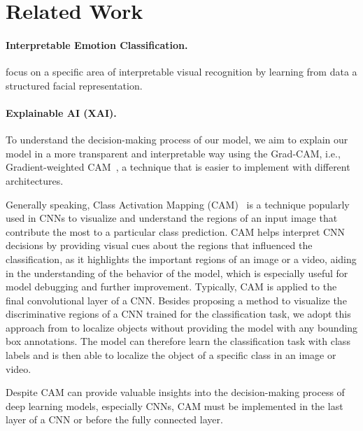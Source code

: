 \section{Related Work}
\label{sec:related}

\paragraph{Interpretable Emotion Classification.}

\citet{YinTLS019} focus on a specific area of interpretable visual recognition by learning from data a structured facial representation. 
\citet{Malik0R21} 

\paragraph{Explainable AI (XAI).}
To understand the decision-making process of our model, 
we aim to explain our model in a more transparent and interpretable way using the Grad-CAM, 
i.e., Gradient-weighted CAM~\cite{SelvarajuCDVPB17}, 
a technique that is easier to implement with different architectures. 

Generally speaking, 
Class Activation Mapping (CAM)~\cite{ZhouKLOT16} is a technique popularly used in CNNs to visualize and understand the regions of an input image that contribute the most to a particular class prediction. 
CAM helps interpret CNN decisions by providing visual cues about the regions that influenced the classification, 
as it highlights the important regions of an image or a video, 
aiding in the understanding of the behavior of the model, 
which is especially useful for model debugging and further improvement. 
Typically,
CAM is applied to the final convolutional layer of a CNN. 
Besides proposing a method to visualize the discriminative regions of a CNN trained for the classification task, 
we adopt this approach from \citet{ZhouKLOT16} to localize objects without providing the model with any bounding box annotations. 
The model can therefore learn the classification task with class labels and is then able to localize the object of a specific class in an image or video. 

Despite CAM can provide valuable insights into the decision-making process of deep learning models, 
especially CNNs, 
CAM must be implemented in the last layer of a CNN or before the fully connected layer.

